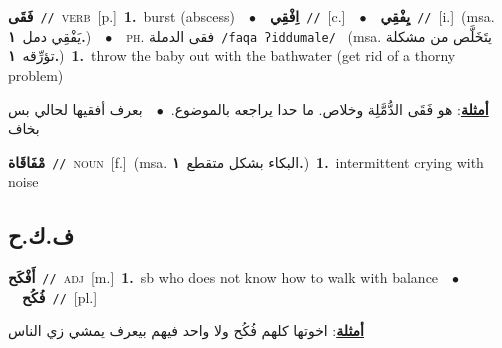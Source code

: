 \documentclass[10pt,a4paper,twoside]{article} %
\begin{document}
\begin{multicols}{2}
{\setlength\topsep{0pt}\textbf{\foreignlanguage{arabic}{فَقَى}}\ {\color{gray}\texttt{//}\color{black}}\ \textsc{verb}\ [p.]\ \textbf{1.}~burst (abscess)\ \ $\bullet$\ \ \setlength\topsep{0pt}\textbf{\foreignlanguage{arabic}{اِفْقِي}}\ {\color{gray}\texttt{//}\color{black}}\ [c.]\ \ $\bullet$\ \ \setlength\topsep{0pt}\textbf{\foreignlanguage{arabic}{يِفْقِي}}\ {\color{gray}\texttt{//}\color{black}}\ [i.]\ \color{gray}(msa. \foreignlanguage{arabic}{يَفْقِي دمل}~\foreignlanguage{arabic}{\textbf{١.}})\color{black}\ \ $\bullet$\ \ \textsc{ph.} \color{gray} \foreignlanguage{arabic}{فقى الدملة}\color{black}\ {\color{gray}\texttt{/{\sffamily faqa ʔiddumale}/}\color{black}}\ \color{gray} (msa. \foreignlanguage{arabic}{يتَخَلَّص من مشكلة تؤرِّقه}~\foreignlanguage{arabic}{\textbf{١.}})\color{black}\ \textbf{1.}~throw the baby out with the bathwater (get rid of a thorny problem)\  \begin{flushright}\color{gray}\foreignlanguage{arabic}{\textbf{\underline{\foreignlanguage{arabic}{أمثلة}}}: هو فَقَى الدُّمَّلِة وخلاص. ما حدا يراجعه بالموضوع.\ $\bullet$\ \  بعرف أفقيها لحالي بس بخاف}\end{flushright}\color{black}} \vspace{2mm}

{\setlength\topsep{0pt}\textbf{\foreignlanguage{arabic}{مْفَاقَاة}}\ {\color{gray}\texttt{//}\color{black}}\ \textsc{noun}\ [f.]\ \color{gray}(msa. \foreignlanguage{arabic}{البكاء بشكل متقطع}~\foreignlanguage{arabic}{\textbf{١.}})\color{black}\ \textbf{1.}~intermittent crying with noise\ } \vspace{2mm}

\vspace{-3mm}
\subsection*{\color{blue}\foreignlanguage{arabic}{ف.ك.ح}\color{blue}{}} 

{\setlength\topsep{0pt}\textbf{\foreignlanguage{arabic}{أَفْكَح}}\ {\color{gray}\texttt{//}\color{black}}\ \textsc{adj}\ [m.]\ \textbf{1.}~sb who does not know how to walk with balance\ \ $\bullet$\ \ \setlength\topsep{0pt}\textbf{\foreignlanguage{arabic}{فُكُح}}\ {\color{gray}\texttt{//}\color{black}}\ [pl.]\  \begin{flushright}\color{gray}\foreignlanguage{arabic}{\textbf{\underline{\foreignlanguage{arabic}{أمثلة}}}: اخوتها كلهم فُكُح ولا واحد فيهم بيعرف يمشي زي الناس}\end{flushright}\color{black}} \vspace{2mm}


\end{multicols}
\end{document}
